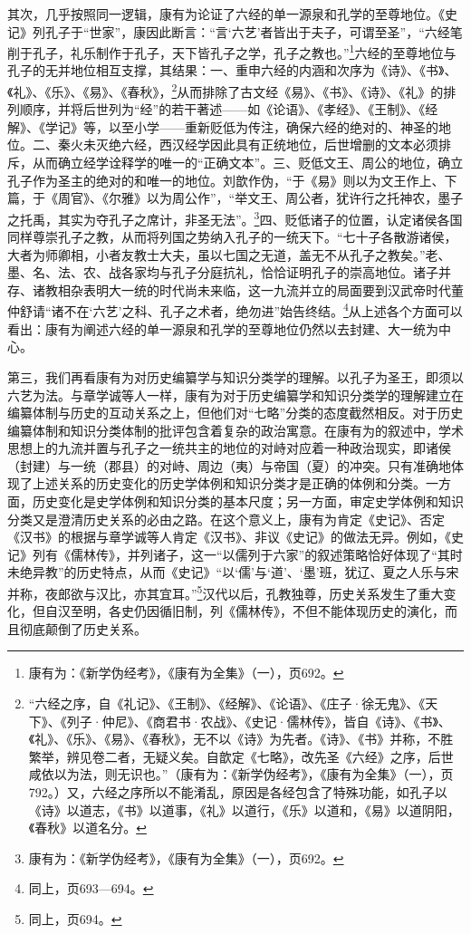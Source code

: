 \documentclass[a4paper, 12pt, openright]{ctexbook}
\begin{document}
其次，几乎按照同一逻辑，康有为论证了六经的单一源泉和孔学的至尊地位。《史记》列孔子于“世家”，康因此断言：“言‘六艺’者皆出于夫子，可谓至圣”，“六经笔削于孔子，礼乐制作于孔子，天下皆孔子之学，孔子之教也。”\footnote{康有为：《新学伪经考》，《康有为全集》（一），页692。}六经的至尊地位与孔子的无并地位相互支撑，其结果：一、重申六经的内涵和次序为《诗》、《书》、《礼》、《乐》、《易》、《春秋》，\footnote{“六经之序，自《礼记》、《王制》、《经解》、《论语》、《庄子·徐无鬼》、《天下》、《列子·仲尼》、《商君书·农战》、《史记·儒林传》，皆自《诗》、《书》、《礼》、《乐》、《易》、《春秋》，无不以《诗》为先者。《诗》、《书》并称，不胜繁举，辨见卷二者，无疑义矣。自歆定《七略》，改先圣《六经》之序，后世咸依以为法，则无识也。”（康有为：《新学伪经考》，《康有为全集》（一），页792。）又，六经之序所以不能淆乱，原因是各经包含了特殊功能，如孔子以《诗》以道志，《书》以道事，《礼》以道行，《乐》以道和，《易》以道阴阳，《春秋》以道名分。}从而排除了古文经《易》、《书》、《诗》、《礼》的排列顺序，并将后世列为“经”的若干著述——如《论语》、《孝经》、《王制》、《经解》、《学记》等，以至小学——重新贬低为传注，确保六经的绝对的、神圣的地位。二、秦火未灭绝六经，西汉经学因此具有正统地位，后世增删的文本必须排斥，从而确立经学诠释学的唯一的“正确文本”。三、贬低文王、周公的地位，确立孔子作为圣主的绝对的和唯一的地位。刘歆作伪，“于《易》则以为文王作上、下篇，于《周官》、《尔雅》以为周公作”，“举文王、周公者，犹许行之托神农，墨子之托禹，其实为夺孔子之席计，非圣无法”。\footnote{康有为：《新学伪经考》，《康有为全集》（一），页692。}四、贬低诸子的位置，认定诸侯各国同样尊崇孔子之教，从而将列国之势纳入孔子的一统天下。“七十子各散游诸侯，大者为师卿相，小者友教士大夫，虽以七国之无道，盖无不从孔子之教矣。”老、墨、名、法、农、战各家均与孔子分庭抗礼，恰恰证明孔子的崇高地位。诸子并存、诸教相杂表明大一统的时代尚未来临，这一九流并立的局面要到汉武帝时代董仲舒请“诸不在‘六艺’之科、孔子之术者，绝勿进”始告终结。\footnote{同上，页693—694。}从上述各个方面可以看出：康有为阐述六经的单一源泉和孔学的至尊地位仍然以去封建、大一统为中心。

第三，我们再看康有为对历史编纂学与知识分类学的理解。以孔子为圣王，即须以六艺为法。与章学诚等人一样，康有为对于历史编纂学和知识分类学的理解建立在编纂体制与历史的互动关系之上，但他们对“七略”分类的态度截然相反。对于历史编纂体制和知识分类体制的批评包含着复杂的政治寓意。在康有为的叙述中，学术思想上的九流并置与孔子之一统共主的地位的对峙对应着一种政治现实，即诸侯（封建）与一统（郡县）的对峙、周边（夷）与帝国（夏）的冲突。只有准确地体现了上述关系的历史变化的历史学体例和知识分类才是正确的体例和分类。一方面，历史变化是史学体例和知识分类的基本尺度；另一方面，审定史学体例和知识分类又是澄清历史关系的必由之路。在这个意义上，康有为肯定《史记》、否定《汉书》的根据与章学诚等人肯定《汉书》、非议《史记》的做法无异。例如，《史记》列有《儒林传》，并列诸子，这一“以儒列于六家”的叙述策略恰好体现了“其时未绝异教”的历史特点，从而《史记》“以‘儒’与‘道’、‘墨’班，犹辽、夏之人乐与宋并称，夜郎欲与汉比，亦其宜耳。”\footnote{同上，页694。}汉代以后，孔教独尊，历史关系发生了重大变化，但自汉至明，各史仍因循旧制，列《儒林传》，不但不能体现历史的演化，而且彻底颠倒了历史关系。
\end{document}
